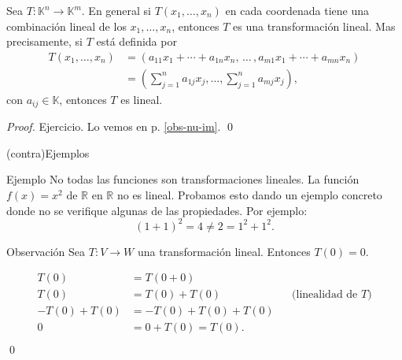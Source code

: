 \documentclass[handout]{beamer} %
\newcommand{\R}{\mathbb R}
\newcommand{\K}{\mathbb K}
\begin{document}
\begin{frame}
    \begin{observacion}\label{obs-tl-1.5}     Sea $T: \K^n \to \K^m$. En  general si $T(x_1,\ldots,x_n)$ en cada coordenada tiene una combinación lineal de los $x_1,\ldots,x_n$,  entonces $T$ es una transformación lineal. Mas precisamente, si $T$ está definida por
        \begin{align*}
        T(x_1,\ldots,x_n) &= (a_{11}x_1+\cdots + a_{1n}x_n,\, \ldots\,,a_{m1}x_1+\cdots + a_{mn}x_n )\\
        &=(\sum_{j=1}^n a_{1j} x_j,\ldots,\sum_{j=1}^n a_{mj} x_j),
        \end{align*}
        con $a_{ij} \in \K$, entonces $T$  es lineal. 
    \end{observacion}\pause
    \begin{proof} Ejercicio. \pause Lo  vemos  en  p. \ref{obs-nu-im}. \qed
    \end{proof}
\end{frame}



\begin{frame}{(contra)Ejemplos}
\begin{exampleblock}{Ejemplo}
No todas las funciones son transformaciones lineales. La función $f(x)=x^2$ de $\R$ en $\R$ no es lineal. Probamos esto dando un ejemplo concreto donde no se verifique algunas de las propiedades. Por ejemplo:
$$
(1+1)^2=4\neq2= 1^2+1^2.
$$


\end{exampleblock}
 \vskip 3cm
\end{frame}



\begin{frame}


\begin{block}{Observación}
Sea $T:V\longrightarrow W$ una transformación lineal. Entonces $T(0)=0$. \pause
\end{block}
\begin{demostracion}
    \vskip -0.8cm
\begin{align*}
T(0)&=T(0+0)&&\\
T(0)&=T(0)+T(0)&&\text{(linealidad de $T$)}\\
-T(0) + T(0)&=- T(0) + T(0)+T(0)&&\\
0&= 0 + T(0) = T(0).&& \\
\end{align*}\qed 
\end{demostracion}

\vskip 2cm

\end{frame}
\end{document}
